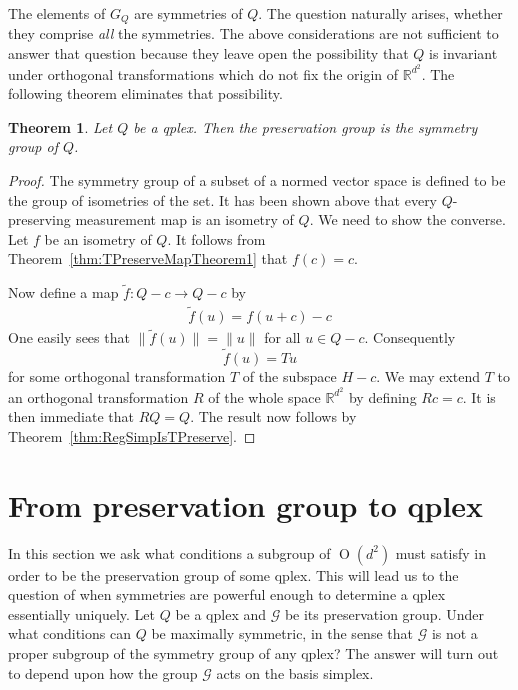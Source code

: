 \documentclass[aps,pra,superscriptaddress,10pt,tightenlines,twocolumn,nofootinbib]{revtex4}
\newtheorem{theorem}{Theorem}
\theoremstyle{remark}
\newcommand{\be}{\begin{equation}}
\newcommand{\ee}{\end{equation}}
\newcommand{\ea}[1]{\begin{align}#1\end{align}}
\newcommand{\fd}[1]{\mathbb{#1}}
\newcommand{\la}{\langle}
\newcommand{\ra}{\rangle}
\newcommand{\ro}{r_{\rm{o}}}
\newcommand{\qp}{Q}
\newcommand{\gp}{\mathcal{G}}
\newcommand{\qplex}{qplex}
\newcommand{\qgp}[1]{G_{#1}}
\DeclareMathOperator{\Ot}{O}
\begin{document}
The elements of $\qgp{\qp}$ are symmetries of  $\qp$.  The question naturally arises, whether they comprise \emph{all} the symmetries.  The above considerations are not sufficient to answer that question because they leave open the possibility that $\qp$ is invariant under  orthogonal transformations which do not fix the origin of $\fd{R}^{d^2}$.  The following theorem eliminates that possibility.
\begin{theorem}
\label{tm:preservation-symmetry}
Let $\qp$ be a \qplex.  Then the preservation group  is the symmetry group of $\qp$.
\end{theorem}
\begin{proof}
The symmetry group of a subset of a normed vector space is defined to be the group of isometries of the set.  It has been shown above that every $\qp$-preserving measurement map is an isometry of $\qp$. We need to show the converse.  Let $f$ be an isometry of $\qp$.  It follows from Theorem~\ref{thm:TPreserveMapTheorem1} that $f(c) = c$.

Now define a map $\tilde{f}\colon \qp-c \to \qp-c$ by
\ea{
\tilde{f}(u) = f(u+c) - c
}
One easily sees that $\|\tilde{f}(u)\| = \|u\|$ for all $u \in \qp-c$.  Consequently
\be
\tilde{f}(u) = T u
\ee
for some orthogonal transformation $T$ of the subspace $H-c$.  We may extend $T$ to an orthogonal transformation $R$ of the whole space $\fd{R}^{d^2}$ by defining $Rc = c$.  It is then immediate that $R\qp = \qp$.  The result now follows by Theorem~\ref{thm:RegSimpIsTPreserve}.

\end{proof}



\section{From preservation group to \qplex}
\label{sec:qgroups}
In this section we ask what conditions a subgroup of $\Ot(d^2)$ must
satisfy in order to be the preservation group of some \qplex.  This
will lead us to the question of when symmetries are powerful enough to
determine a qplex essentially uniquely.  Let $\qp$ be a qplex and $\gp$ be
its preservation group.  Under what conditions can $\qp$ be maximally
symmetric, in the sense that $\gp$ is not a proper subgroup of the
symmetry group of any qplex?  The answer will turn out to depend upon
how the group $\gp$ acts on the basis simplex.
\end{document}
